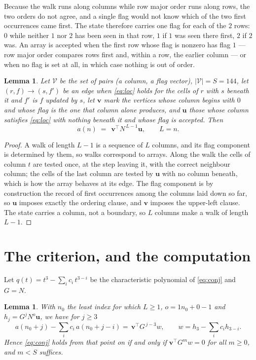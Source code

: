 \documentclass[11pt,a4paper]{article}
\theoremstyle{plain}
\newtheorem{lemma}[theorem]{Lemma}
\theoremstyle{definition}
\begin{document}
Because the walk runs along columns while row major order runs along
rows, the two orders do not agree, and a single flag would not know which of the two
first occurrences came first. The state therefore carries one flag for each of the $2$
rows: $0$ while neither $1$ nor $2$ has been seen in that row, $1$ if $1$
was seen there first, $2$ if $2$ was. An array is accepted when the first row whose
flag is nonzero has flag $1$ --- row major order compares rows first and, within a
row, the earlier column --- or when no flag is set at all, in which case nothing is out of
order.

\begin{lemma}\label{lem:walk}
Let $\mathcal V$ be the set of pairs (a column, a flag vector), $|\mathcal V|=S=144$, let
$(r,f)\to(s,f')$ be an edge when \eqref{eq:loc} holds for the cells of $r$ with $s$ beneath
it and $f'$ is $f$ updated by $s$, let $\mathbf{v}$ mark the vertices whose column begins
with $0$ and whose flag is the one that column alone produces, and $\mathbf{u}$ those whose
column satisfies \eqref{eq:loc} with nothing beneath it and whose flag is accepted. Then
\[
a(n)\;=\;\,\mathbf{v}^{\!\top}N^{\,L-1}\mathbf{u},\qquad L=n.
\]
\end{lemma}

\begin{proof}
A walk of length $L-1$ is a sequence of $L$ columns, and its flag component is determined by
them, so walks correspond to arrays. Along the walk the cells of column $t$ are tested once,
at the step leaving it, with the correct neighbour column; the cells of the last column are
tested by $\mathbf{u}$ with no column beneath, which is how the array behaves at its edge.
The flag component is by construction the record of first occurrences among the columns laid
down so far, so $\mathbf{u}$ imposes exactly the ordering clause, and $\mathbf{v}$ imposes
the upper-left clause. The state carries a column, not a boundary, so $L$ columns make a walk
of length $L-1$.
\end{proof}

\section{The criterion, and the computation}

Let $q(t)=t^{3}-\sum_i c_i\,t^{3-i}$ be the characteristic polynomial of
\eqref{eq:conj} and $G=N$.

\begin{lemma}\label{lem:crit}
With $n_0$ the least index for which $L\ge1$, $o=1n_0+0-1$ and
$h_j=G^{j}N^{o}\mathbf{u}$, we have for $j\ge3$
\[
a(n_0+j)-\sum_i c_i\,a(n_0+j-i)=\,\mathbf{v}^{\!\top}G^{\,j-3}w,
\qquad w=h_{3}-\sum_i c_ih_{3-i} .
\]
Hence \eqref{eq:conj} holds from that point on if and only if
$\mathbf{v}^{\!\top}G^{m}w=0$ for all $m\ge0$, and $m<S$ suffices.
\end{lemma}
\end{document}
